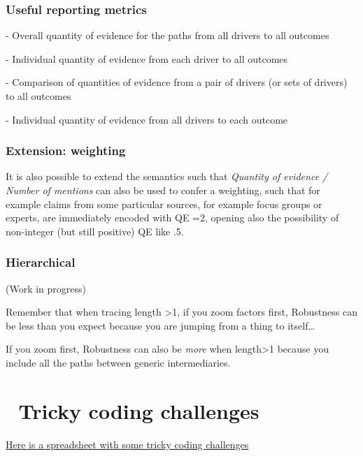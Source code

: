 \documentclass[
]{book}
\begin{document}
\hypertarget{useful-reporting-metrics}{%
\subsection{Useful reporting metrics}\label{useful-reporting-metrics}}

- Overall quantity of evidence for the paths from all drivers to all outcomes

- Individual quantity of evidence from each driver to all outcomes

- Comparison of quantities of evidence from a pair of drivers (or sets of drivers) to all outcomes

- Individual quantity of evidence from all drivers to each outcome

\textbf{
}

\hypertarget{extension-weighting}{%
\subsection{Extension: weighting}\label{extension-weighting}}

It is also possible to extend the semantics such that \emph{Quantity of evidence / Number of mentions} can also be used to confer a weighting, such that for example claims from some particular sources, for example focus groups or experts, are immediately encoded with QE =2, opening also the possibility of non-integer (but still positive) QE like .5.

\hypertarget{hierarchical}{%
\subsection{Hierarchical}\label{hierarchical}}

(Work in progress)

Remember that when tracing length \textgreater1, if you zoom factors first, Robustness can be less than you expect because you are jumping from a thing to itself\ldots{}

If you zoom first, Robustness can also be \emph{more} when length\textgreater1 because you include all the paths between generic intermediaries.

\hypertarget{tricky-coding-challenges}{%
\chapter{🧠 Tricky coding challenges}\label{tricky-coding-challenges}}

\href{https://docs.google.com/spreadsheets/d/1aRCKmuLO3rJR5gXo6-hW_WuOHRAJQ-DzJsUdgO44JCE/edit\#gid=0}{Here is a spreadsheet with some tricky coding challenges}
\end{document}
